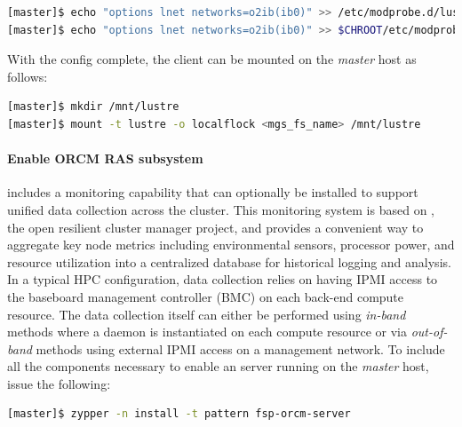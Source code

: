 \documentclass[letterpaper]{article}
\begin{document}
\begin{lstlisting}[language=bash,keywords={},upquote=true]
[master]$ echo "options lnet networks=o2ib(ib0)" >> /etc/modprobe.d/lustre.conf
[master]$ echo "options lnet networks=o2ib(ib0)" >> $CHROOT/etc/modprobe.d/lustre.conf
\end{lstlisting}

With the \Lustre{} config complete, the client can be mounted on the {\em master}
host as follows:
\begin{lstlisting}[language=bash,keywords={},upquote=true]
[master]$ mkdir /mnt/lustre
[master]$ mount -t lustre -o localflock <mgs_fs_name> /mnt/lustre
\end{lstlisting}



\paragraph{Enable ORCM RAS subsystem} 

\FSP{} includes a monitoring capability that can optionally be installed to
support unified data collection across the cluster. This monitoring system is
based on \ORCM{}, the open resilient cluster manager project, and provides a
convenient way to aggregate key node metrics including environmental sensors,
processor power, and resource utilization into a centralized database for
historical logging and analysis.  In a typical HPC configuration, \ORCM{} data
collection relies on having IPMI access to the baseboard management controller
(BMC) on each back-end compute resource. The data collection itself can either
be performed using {\em in-band} methods where a daemon is instantiated on each
compute resource or via {\em out-of-band} methods using external IPMI access on
a management network. To include all the components necessary to enable an \ORCM{}
server running on the {\em master} host, issue the following:

\begin{lstlisting}[language=bash]
[master]$ zypper -n install -t pattern fsp-orcm-server
\end{lstlisting}
\end{document}
